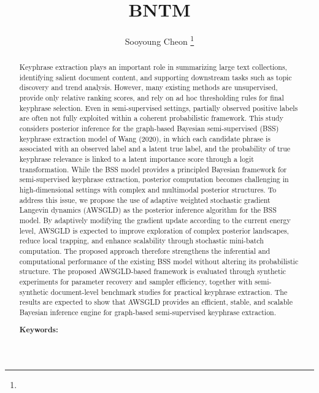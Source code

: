 \documentclass[11pt]{article}
\begin{document}
\thispagestyle{empty}

\title{BNTM
}

\author{Sooyoung Cheon \thanks{
 }
}
\maketitle


\begin{abstract}

Keyphrase extraction plays an important role in summarizing large text collections, identifying salient document content, and supporting downstream tasks such as topic discovery and trend analysis. However, many existing methods are unsupervised, provide only relative ranking scores, and rely on ad hoc thresholding rules for final keyphrase selection. Even in semi-supervised settings, partially observed positive labels are often not fully exploited within a coherent probabilistic framework. This study considers posterior inference for the graph-based Bayesian semi-supervised (BSS) keyphrase extraction model of Wang (2020), in which each candidate phrase is associated with an observed label and a latent true label, and the probability of true keyphrase relevance is linked to a latent importance score through a logit transformation. While the BSS model provides a principled Bayesian framework for semi-supervised keyphrase extraction, posterior computation becomes challenging in high-dimensional settings with complex and multimodal posterior structures. To address this issue, we propose the use of adaptive weighted stochastic gradient Langevin dynamics (AWSGLD) as the posterior inference algorithm for the BSS model. By adaptively modifying the gradient update according to the current energy level, AWSGLD is expected to improve exploration of complex posterior landscapes, reduce local trapping, and enhance scalability through stochastic mini-batch computation. The proposed approach therefore strengthens the inferential and computational performance of the existing BSS model without altering its probabilistic structure. The proposed AWSGLD-based framework is evaluated through synthetic experiments for parameter recovery and sampler efficiency, together with semi-synthetic document-level benchmark studies for practical keyphrase extraction. The results are expected to show that AWSGLD provides an efficient, stable, and scalable Bayesian inference engine for graph-based semi-supervised keyphrase extraction.

{\bf  Keywords:} 
 
\end{abstract}
\end{document}
